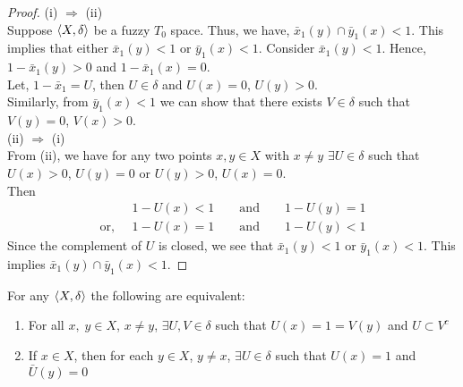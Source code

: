 \documentclass[../main-sheet.tex]{subfiles}
\begin{document}
\begin{proof}
    (i) \(\Rightarrow\) (ii)\\
    Suppose \(\langle X, \delta \rangle \) be a fuzzy \(T_0\) space. Thus, we have, \(\bar{x}_1(y)\cap \bar{y}_1(x)<1\). This implies that either \(\bar{x}_1(y)<1\) or \( \bar{y}_1(x)<1\). Consider \(\bar{x}_1(y)<1\). Hence, \(1-\bar{x}_1(y)>0\) and \(1-\bar{x}_1(x)=0\).\\ Let, \(1-\bar{x}_1=U\), then \(U\in\delta\) and \(U(x)=0\), \(U(y)>0\).\\ Similarly, from \( \bar{y}_1(x)<1\) we can show that there exists \(V\in \delta\) such that \(V(y)=0\), \(V(x)>0\).\\


    (ii) \(\Rightarrow\) (i)\\
    From (ii), we have for any two points \(x,y\in X \) with \(x\neq y \) \(\exists U\in\delta\) such that \(U(x)>0\), \(U(y)=0\) or \(U(y)>0\), \(U(x)=0\).\\
    Then \begin{align*}
        &1-U(x)<1\qquad \text{and}\qquad 1-U(y)=1\\
        \text{or, }\;&1-U(x)=1\qquad \text{and}\qquad 1-U(y)<1
    \end{align*}
    Since the complement of \(U \) is closed, we see that \(\bar{x}_1(y)<1\) or \(\bar{y}_1(x)<1\). This implies \(\bar{x}_1(y)\cap \bar{y}_1(x)<1\).
\end{proof}
\begin{thm}
    For any \fts\s \(\langle X, \delta \rangle\) the following are equivalent:
    \begin{enumerate}[label=(\roman*)]
        \item For all \(x,\;y\in X \), \(x\neq y \), \(\exists U,V\in\delta\) such that \(U(x)=1=V(y )\) and \(U\subset V^c\)
        \item If \(x\in X \), then for each \(y\in X \), \(y\neq x \), \(\exists U\in\delta\) such that \(U(x)=1\) and \(\bar{U}(y)=0\)
    \end{enumerate}
\end{thm}
\end{document}
